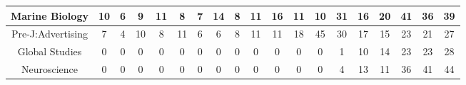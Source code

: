 \documentclass[10]{article}
\begin{document}
\begin{landscape}
\begin{longtable}[c]{|ccccccccccccccccccc|}
	\multicolumn{1}{|c|}{Marine Biology}                             & \multicolumn{1}{c|}{10}         & \multicolumn{1}{c|}{6}          & \multicolumn{1}{c|}{9}          & \multicolumn{1}{c|}{11}         & \multicolumn{1}{c|}{8}          & \multicolumn{1}{c|}{7}          & \multicolumn{1}{c|}{14}         & \multicolumn{1}{c|}{8}          & \multicolumn{1}{c|}{11}         & \multicolumn{1}{c|}{16}         & \multicolumn{1}{c|}{11}         & \multicolumn{1}{c|}{10}         & \multicolumn{1}{c|}{31}         & \multicolumn{1}{c|}{16}         & \multicolumn{1}{c|}{20}         & \multicolumn{1}{c|}{41}         & \multicolumn{1}{c|}{36}         & 39         \\ \hline
	\multicolumn{1}{|c|}{Pre-J:Advertising}                          & \multicolumn{1}{c|}{7}          & \multicolumn{1}{c|}{4}          & \multicolumn{1}{c|}{10}         & \multicolumn{1}{c|}{8}          & \multicolumn{1}{c|}{11}         & \multicolumn{1}{c|}{6}          & \multicolumn{1}{c|}{6}          & \multicolumn{1}{c|}{8}          & \multicolumn{1}{c|}{11}         & \multicolumn{1}{c|}{11}         & \multicolumn{1}{c|}{18}         & \multicolumn{1}{c|}{45}         & \multicolumn{1}{c|}{30}         & \multicolumn{1}{c|}{17}         & \multicolumn{1}{c|}{15}         & \multicolumn{1}{c|}{23}         & \multicolumn{1}{c|}{21}         & 27         \\ \hline
	\multicolumn{1}{|c|}{Global Studies}                             & \multicolumn{1}{c|}{0}          & \multicolumn{1}{c|}{0}          & \multicolumn{1}{c|}{0}          & \multicolumn{1}{c|}{0}          & \multicolumn{1}{c|}{0}          & \multicolumn{1}{c|}{0}          & \multicolumn{1}{c|}{0}          & \multicolumn{1}{c|}{0}          & \multicolumn{1}{c|}{0}          & \multicolumn{1}{c|}{0}          & \multicolumn{1}{c|}{0}          & \multicolumn{1}{c|}{0}          & \multicolumn{1}{c|}{1}          & \multicolumn{1}{c|}{10}         & \multicolumn{1}{c|}{14}         & \multicolumn{1}{c|}{23}         & \multicolumn{1}{c|}{23}         & 28         \\ \hline
	\multicolumn{1}{|c|}{Neuroscience}                               & \multicolumn{1}{c|}{0}          & \multicolumn{1}{c|}{0}          & \multicolumn{1}{c|}{0}          & \multicolumn{1}{c|}{0}          & \multicolumn{1}{c|}{0}          & \multicolumn{1}{c|}{0}          & \multicolumn{1}{c|}{0}          & \multicolumn{1}{c|}{0}          & \multicolumn{1}{c|}{0}          & \multicolumn{1}{c|}{0}          & \multicolumn{1}{c|}{0}          & \multicolumn{1}{c|}{0}          & \multicolumn{1}{c|}{4}          & \multicolumn{1}{c|}{13}         & \multicolumn{1}{c|}{11}         & \multicolumn{1}{c|}{36}         & \multicolumn{1}{c|}{41}         & 44         \\ \hline

\end{longtable}
\end{landscape}
\end{document}
